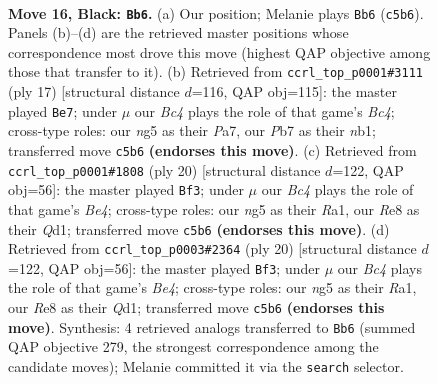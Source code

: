 \documentclass[11pt]{article}
\begin{document}
\clearpage

\begin{figure}[p]\centering
\begin{subfigure}{0.46\textwidth}\centering
\resizebox{\linewidth}{!}{%
\newchessgame
\chessboard[
  setfen={rn2r1k1/ppq2ppp/4b3/2bn2N1/P6P/1N4P1/1P3PB1/R1BQ1RK1 b - - 3 16},
  showmover=false,
  pgfstyle=straightmove, color=movearrow, markmove={c5-b6}
]}
\caption{}
\end{subfigure}\hfill
\begin{subfigure}{0.46\textwidth}\centering
\resizebox{\linewidth}{!}{%
\newchessgame
\chessboard[
  setfen={rnbq1rk1/pp3ppp/4p3/2bn4/8/1N4P1/PP2PPBP/RNBQ1RK1 b - - 1 9},
  showmover=false,
  pgfstyle=straightmove, color=movearrow, markmove={c5-e7}
]}
\caption{}
\end{subfigure}
\\[4pt]
\begin{subfigure}{0.46\textwidth}\centering
\resizebox{\linewidth}{!}{%
\newchessgame
\chessboard[
  setfen={r1bqkb1r/ppp3pp/1n6/5p2/1n1PB3/2N1B3/PP3PPP/R2QK1NR w KQkq - 0 11},
  showmover=false,
  pgfstyle=straightmove, color=movearrow, markmove={e4-f3}
]}
\caption{}
\end{subfigure}\hfill
\begin{subfigure}{0.46\textwidth}\centering
\resizebox{\linewidth}{!}{%
\newchessgame
\chessboard[
  setfen={r1bqkb1r/ppp3pp/1n6/5p2/1n1PB3/2N1B3/PP3PPP/R2QK1NR w KQkq - 0 11},
  showmover=false,
  pgfstyle=straightmove, color=movearrow, markmove={e4-f3}
]}
\caption{}
\end{subfigure}
\caption{\textbf{Move 16, Black: \texttt{Bb6}.} (a) Our position; Melanie plays \texttt{Bb6} (\texttt{c5b6}). Panels (b)--(d) are the retrieved master positions whose correspondence most drove this move (highest QAP objective among those that transfer to it). (b) Retrieved from \texttt{ccrl\_top\_p0001\#3111} (ply 17) [structural distance $d$=116, QAP obj=115]: the master played \texttt{Be7}; under $\mu$ our \emph{Bc4} plays the role of that game's \emph{Bc4}; cross-type roles: our \emph{n}g5 as their \emph{P}a7, our \emph{P}b7 as their \emph{n}b1; transferred move \texttt{c5b6} \textbf{(endorses this move)}. (c) Retrieved from \texttt{ccrl\_top\_p0001\#1808} (ply 20) [structural distance $d$=122, QAP obj=56]: the master played \texttt{Bf3}; under $\mu$ our \emph{Bc4} plays the role of that game's \emph{Be4}; cross-type roles: our \emph{n}g5 as their \emph{R}a1, our \emph{R}e8 as their \emph{Q}d1; transferred move \texttt{c5b6} \textbf{(endorses this move)}. (d) Retrieved from \texttt{ccrl\_top\_p0003\#2364} (ply 20) [structural distance $d$=122, QAP obj=56]: the master played \texttt{Bf3}; under $\mu$ our \emph{Bc4} plays the role of that game's \emph{Be4}; cross-type roles: our \emph{n}g5 as their \emph{R}a1, our \emph{R}e8 as their \emph{Q}d1; transferred move \texttt{c5b6} \textbf{(endorses this move)}. Synthesis: 4 retrieved analogs transferred to \texttt{Bb6} (summed QAP objective 279, the strongest correspondence among the candidate moves); Melanie committed it via the \texttt{search} selector.}
\label{fig:thought-m31}
\end{figure}
\end{document}
